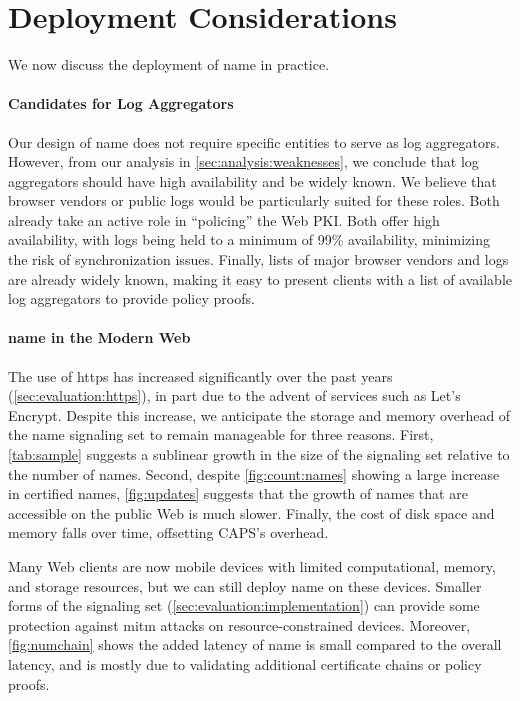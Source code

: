\section{Deployment Considerations}
\label{sec:discussion}

We now discuss the deployment of \ac{name} in practice. 

\paragraph{Candidates for Log Aggregators}
Our design of \ac{name} does not require specific entities to serve as log
aggregators. However, from our analysis in \autoref{sec:analysis:weaknesses},
we conclude that log aggregators should have high availability and be widely
known. We believe that browser vendors or public logs would be particularly
suited for these roles. Both already take an active role in ``policing'' the
Web PKI. 
Both offer high availability, with logs being held to a minimum of 99\%
availability, minimizing the risk of synchronization issues. Finally, lists
of major browser vendors and logs are already widely known, making it easy to
present clients with a list of available log aggregators to provide policy
proofs.

\paragraph{\ac{name} in the Modern Web}
The use of \ac{https} has increased significantly over the past years
(\autoref{sec:evaluation:https}), in part due to the advent of services such as
Let's Encrypt. Despite this increase, we anticipate the 
storage and memory overhead of the \ac{name} signaling set to remain manageable for
three reasons. First, \autoref{tab:sample} suggests a sublinear growth in the
size of the signaling set relative to the number of names. Second, despite
\autoref{fig:count:names} showing a large increase in certified names, 
\autoref{fig:updates} suggests that the growth
of names that are accessible on the public Web is much slower. Finally, the
cost of disk space and memory falls over time, offsetting CAPS's overhead.

Many Web clients are now mobile devices with limited
computational, memory, and storage resources, but we can still deploy
\ac{name} on these devices. 
Smaller forms of the signaling set (\autoref{sec:evaluation:implementation}) can
provide some protection against \ac{mitm} attacks on resource-constrained
devices. Moreover, \autoref{fig:numchain} shows the added latency of \ac{name}
is small compared to the overall latency, and is mostly due to validating
additional certificate chains or policy proofs.
